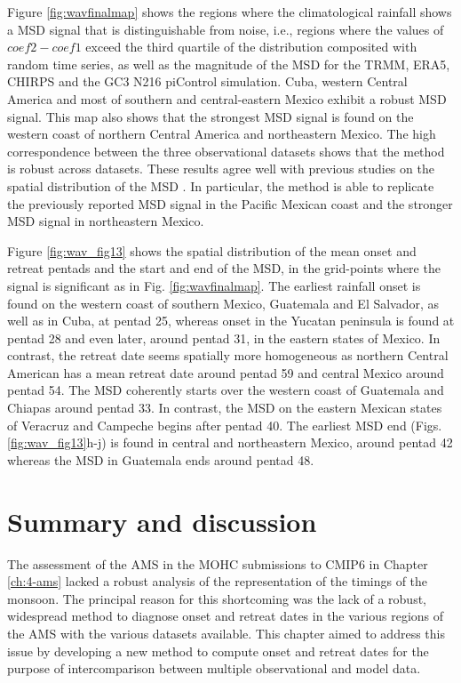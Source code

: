 Figure \ref{fig:wavfinalmap} shows the regions where the climatological rainfall shows a MSD signal that is distinguishable from noise, i.e., regions where the values of $coef2-coef1$ exceed the third quartile of the distribution composited with random time series, as well as the magnitude of the MSD for the TRMM, ERA5, CHIRPS and the GC3 N216 piControl simulation. Cuba, western Central America and most of southern and central-eastern Mexico exhibit a robust MSD signal. 
This map also shows that the strongest MSD signal is found on the western coast of northern Central America and northeastern Mexico. 
The high correspondence between the three observational datasets shows that the method is robust across datasets. These results agree well with previous studies on the spatial distribution of the MSD \citep{magana1999,perdigon2018,anderson2019multiscale,zhao2021}. In particular, the method is able to replicate the previously reported MSD signal in the Pacific Mexican coast and the stronger MSD signal in northeastern Mexico.  

Figure \ref{fig:wav_fig13} shows the spatial distribution of the mean onset and retreat pentads and the start and end of the MSD, in the grid-points where the signal is significant as in Fig. \ref{fig:wavfinalmap}. The earliest rainfall onset is found on the western coast of southern Mexico, Guatemala and El Salvador, as well as in Cuba, at pentad 25, whereas onset in the Yucatan peninsula is found at pentad 28 and even later, around pentad 31, in the eastern states of Mexico. In contrast, the retreat date seems spatially more homogeneous as northern Central American has a mean retreat date around pentad 59 and central Mexico around pentad 54.
The MSD coherently starts over the western coast of Guatemala and Chiapas around pentad 33. In contrast, the MSD on the eastern Mexican states of Veracruz and Campeche begins after pentad 40. The earliest MSD end (Figs. \ref{fig:wav_fig13}h-j) is found in central and northeastern Mexico, around pentad 42 whereas the MSD in Guatemala ends around pentad 48.



\section{Summary and discussion}

The assessment of the AMS in the MOHC submissions to CMIP6 in Chapter \ref{ch:4-ams} lacked a robust analysis of the representation of the timings of the monsoon. 
The principal reason for this shortcoming was the lack of a robust, widespread method to diagnose onset and retreat dates in the various regions of the AMS with the various datasets available. This chapter aimed to address this issue by developing a new method to compute onset and retreat dates for the purpose of intercomparison between multiple observational and model data.

